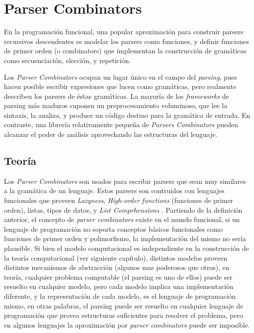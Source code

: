 
\chapter{Parser Combinators}

En la programación funcional, una popular aproximación para construir parsers recursivos descendentes es modelar los parsers como funciones, y definir funciones de primer orden (o combinators) que implementan la construcción de gramáticas como secuenciación, elección, y repetición.\cite{Hutton1996}

Los \emph{Parser Combinators} ocupan un lugar único en el campo del \emph{parsing}, pues hacen posible escribir expresiones que lucen como gramáticas, pero realmente describen los parsers de éstas gramáticas. La mayoría de los \emph{frameworks} de parsing más maduros suponen un preprocesamiento voluminoso, que lee la sintaxis, la analiza, y produce un código destino para la gramática de entrada. En contraste, una librería relativamente pequeña de \emph{Parsers Combinators} pueden alcanzar el poder de análisis aprovechando las estructuras del lenguaje.\cite{Swierstra2008}


\section{Teoría}

Los \emph{Parser Combinators} son usados para escribir parsers que sean muy similares a la gramática de un lenguaje. Estos parsers son contruidos con lenguajes funcionales que proveen \emph{Lazyness}, \emph{High-order functions} (funciones de primer orden), listas, tipos de datos, y \emph{List Comprhensions} \cite{Jeuring2010}. Partiendo de la definición anterior, el concepto de \emph{parser combinators} existe en el mundo funcional, si un lenguaje de programación no soporta conceptos básicos funcionales como funciones de primer orden y polimorfismo, la implementación del mismo no sería plausible. Si bien el modelo computacional es independiente en la construcción de la teoría computacional (ver siguiente capítulo), distintos modelos proveen distintos mecanismos de abstracción (algunos mas poderosos que otros), en teoría, cualquier problema computable (el parsing es uno de ellos) puede ser resuelto en cualquier modelo, pero cada modelo implica una implementación diferente, y la representación de cada modelo, es el lenguaje de programación mismo, en otras palabras, el parsing puede ser resuelto en cualquier lenguaje de programación que provea estructuras suficientes para resolver el problema, pero en algunos lenguajes la aproximación por \emph{parser combinators} puede ser imposible.

